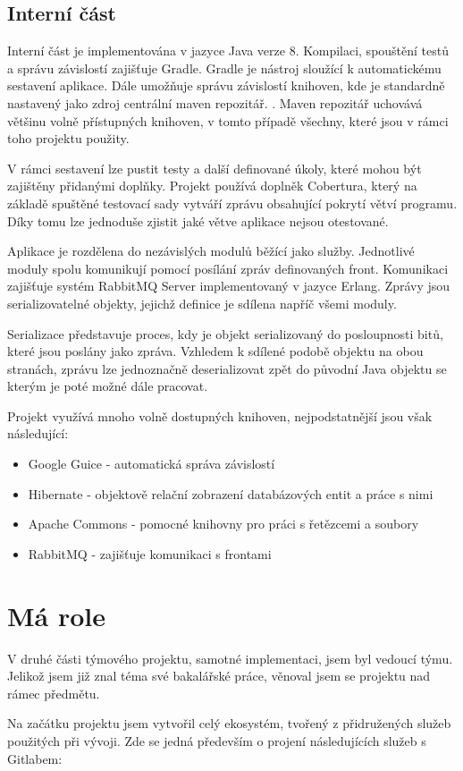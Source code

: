 \documentclass[thesis=B,czech]{FITthesis}[2012/06/26]
\begin{document}
\subsection{Interní část}
Interní část je implementována v jazyce Java verze 8. Kompilaci, spouštění testů a správu závislostí zajišťuje Gradle\cite{gradle}.
Gradle je nástroj sloužící k automatickému sestavení aplikace. Dále umožňuje správu závislostí knihoven, kde je standardně nastavený jako zdroj
centrální maven repozitář. \cite{mavenRepo}. Maven repozitář uchovává většinu volně přístupných knihoven, v tomto případě všechny, které jsou v rámci toho projektu použity.
\par
V rámci sestavení lze pustit testy a další definované úkoly, které mohou být zajištěny přidanými doplňky. Projekt používá
doplněk Cobertura\cite{cobertura}, který na základě spuštěné testovací sady vytváří zprávu obsahující pokrytí větví programu.
Díky tomu lze jednoduše zjistit jaké větve aplikace nejsou otestované.
\par
Aplikace je rozdělena do nezávislých modulů běžící jako služby. Jednotlivé moduly spolu komunikují
pomocí posílání zpráv definovaných front. Komunikaci zajišťuje systém RabbitMQ Server implementovaný v jazyce Erlang. Zprávy jsou serializovatelné objekty, jejichž definice je sdílena napříč všemi moduly.
\par
Serializace představuje proces, kdy je objekt serializovaný do posloupnosti bitů, které jsou poslány jako zpráva. 
Vzhledem k sdílené podobě objektu na obou stranách, zprávu lze jednoznačně deserializovat zpět do původní Java objektu se kterým
je poté možné dále pracovat.\cite{serialization}
\par
Projekt využívá mnoho volně dostupných knihoven, nejpodstatnější jsou však následující:
\begin{itemize}
\item Google Guice - automatická správa závislostí \cite{guice}
\item Hibernate - objektově relační zobrazení databázových entit a práce s nimi \cite{hibernate}
\item Apache Commons - pomocné knihovny pro práci s řetězcemi a soubory \cite{commons}
\item RabbitMQ - zajišťuje komunikaci s frontami \cite{rabbitMQ}
\end{itemize}

\section{Má role}
V druhé části týmového projektu, samotné implementaci, jsem byl vedoucí týmu. Jelikož jsem již znal téma své bakalářské práce, 
věnoval jsem se projektu nad rámec předmětu.
\par
Na začátku projektu jsem vytvořil celý ekosystém, tvořený z přidružených služeb použitých při vývoji.
Zde se jedná především o projení následujících služeb s Gitlabem:
\end{document}
